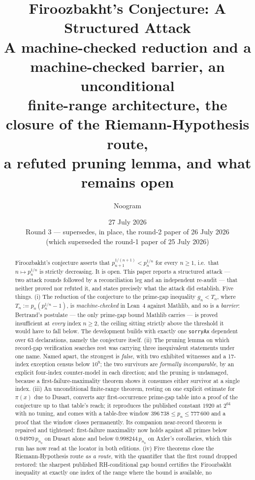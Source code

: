 \documentclass[11pt,a4paper]{article}
\title{Firoozbakht's Conjecture: A Structured Attack\\[2pt]
\large A machine-checked reduction and a machine-checked barrier, an unconditional\\
finite-range architecture, the closure of the Riemann-Hypothesis route,\\
a refuted pruning lemma, and what remains open}
\author{Noogram}
\date{27 July 2026 \\[2pt] \normalsize Round 3 --- supersedes, in place, the round-2 paper of
26 July 2026\\[1pt] \normalsize (which superseded the round-1 paper of 25 July 2026)}
\theoremstyle{plain}
\theoremstyle{definition}
\theoremstyle{remark}
\begin{document}
\maketitle

\begin{abstract}
Firoozbakht's conjecture asserts that $p_{n+1}^{1/(n+1)} < p_n^{1/n}$ for every $n \ge 1$,
i.e.\ that $n \mapsto p_n^{1/n}$ is strictly decreasing. It is open. This paper reports a
structured attack --- two attack rounds followed by a reconciliation leg and an independent
re-audit --- that neither proved nor refuted it, and states precisely what the attack did
establish. Five things. (i) The reduction of the conjecture to the prime-gap
inequality $g_n < T_n$, where $T_n := p_n(p_n^{1/n}-1)$, is \emph{machine-checked} in Lean~4
against Mathlib, and so is a \emph{barrier}: Bertrand's postulate --- the only prime-gap bound
Mathlib carries --- is proved insufficient at \emph{every} index $n \ge 2$, the ceiling sitting
strictly above the threshold it would have to fall below. The development builds with exactly
one \texttt{sorryAx} dependent over 63 declarations, namely the conjecture itself. (ii) The
pruning lemma on which record-gap verification searches rest was carrying three inequivalent
statements under one name. Named apart, the strongest is \emph{false}, with two exhibited
witnesses and a 17-index exception census below $10^9$; the two survivors are
\emph{formally incomparable}, by an explicit four-index counter-model in each direction; and
the pruning is undamaged, because a first-failure-maximality
theorem shows it consumes either survivor at a single index. (iii) An unconditional
finite-range theorem, resting on one explicit estimate for $\pi(x)$ due to Dusart, converts any
first-occurrence prime-gap table into a proof of the conjecture up to that table's reach; it
reproduces the published constant $1920$ at $2^{64}$ with no tuning, and comes with a table-free
window $396\,738 \le p_n \le 777\,600$ and a proof that the window closes permanently. Its
companion near-record theorem is repaired and tightened: first-failure maximality now holds
against all primes below $0.94970\,p_{n_0}$ on Dusart alone and below $0.998244\,p_{n_0}$ on
Axler's corollaries, which this run has now read at the locator in both editions. (iv) Five
theorems close the Riemann-Hypothesis route \emph{as a route}, with the quantifier that the
first round dropped restored: the sharpest published RH-conditional gap bound certifies the
Firoozbakht inequality at exactly one index of the range where the bound is available, no

\end{abstract}
\end{document}
